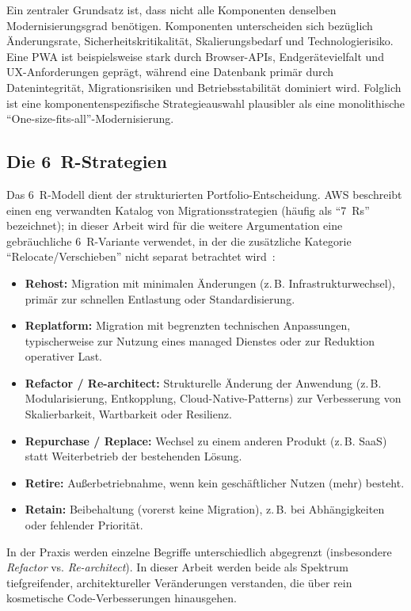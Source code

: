 Ein zentraler Grundsatz ist, dass nicht alle Komponenten denselben Modernisierungsgrad benötigen. Komponenten unterscheiden sich bezüglich Änderungsrate, 
Sicherheitskritikalität, Skalierungsbedarf und Technologierisiko. Eine PWA ist beispielsweise stark durch Browser-APIs, Endgerätevielfalt und UX-Anforderungen geprägt, während eine Datenbank 
primär durch Datenintegrität, Migrationsrisiken und Betriebsstabilität dominiert wird. Folglich ist eine komponentenspezifische Strategieauswahl plausibler als
 eine monolithische \enquote{One-size-fits-all}-Modernisierung.

\subsection{Die 6~R-Strategien}

Das 6~R-Modell dient der strukturierten Portfolio-Entscheidung. AWS beschreibt einen eng verwandten Katalog von Migrationsstrategien (häufig als \enquote{7~Rs} bezeichnet);
 in dieser Arbeit wird für die weitere Argumentation eine gebräuchliche 6~R-Variante verwendet, in der die zusätzliche Kategorie \enquote{Relocate/Verschieben} nicht separat betrachtet wird~\cite{aws2023sixRs}:
\begin{itemize}
  \item \textbf{Rehost:} Migration mit minimalen Änderungen (z.\,B. Infrastrukturwechsel), primär zur schnellen Entlastung oder Standardisierung.
  \item \textbf{Replatform:} Migration mit begrenzten technischen Anpassungen, typischerweise zur Nutzung eines managed Dienstes oder zur Reduktion operativer Last.
  \item \textbf{Refactor / Re-architect:} Strukturelle Änderung der Anwendung (z.\,B. Modularisierung, Entkopplung, Cloud-Native-Patterns) zur Verbesserung von Skalierbarkeit, Wartbarkeit oder Resilienz.
  \item \textbf{Repurchase / Replace:} Wechsel zu einem anderen Produkt (z.\,B. SaaS) statt Weiterbetrieb der bestehenden Lösung.
  \item \textbf{Retire:} Außerbetriebnahme, wenn kein geschäftlicher Nutzen (mehr) besteht.
  \item \textbf{Retain:} Beibehaltung (vorerst keine Migration), z.\,B. bei Abhängigkeiten oder fehlender Priorität.
\end{itemize}

In der Praxis werden einzelne Begriffe unterschiedlich abgegrenzt (insbesondere \emph{Refactor} vs. \emph{Re-architect}). In dieser Arbeit werden beide als Spektrum
 tiefgreifender, architektureller Veränderungen verstanden, die über rein kosmetische Code-Verbesserungen hinausgehen.

